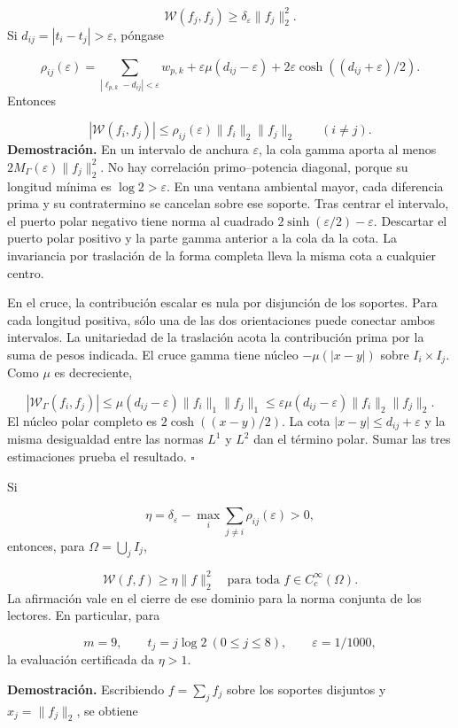 \[
\mathscr W(f_j,f_j)\geq\delta_\varepsilon\|f_j\|_2^2.
\]
Si \(d_{ij}=|t_i-t_j|>\varepsilon\), póngase

\[
\rho_{ij}(\varepsilon)=
\sum_{|\ell_{p,k}-d_{ij}|<\varepsilon}w_{p,k}
+\varepsilon\mu(d_{ij}-\varepsilon)
+2\varepsilon\cosh((d_{ij}+\varepsilon)/2).
\]
Entonces

\[
|\mathscr W(f_i,f_j)|
\leq\rho_{ij}(\varepsilon)\|f_i\|_2\|f_j\|_2
\qquad(i\neq j).
\]
\textbf{Demostración.} En un intervalo de anchura \(\varepsilon\), la cola gamma aporta al menos \(2M_\Gamma(\varepsilon)\|f_j\|_2^2\). No hay correlación primo–potencia diagonal, porque su longitud mínima es \(\log2>\varepsilon\). En una ventana ambiental mayor, cada diferencia prima y su contratermino se cancelan sobre ese soporte. Tras centrar el intervalo, el puerto polar negativo tiene norma al cuadrado \(2\sinh(\varepsilon/2)-\varepsilon\). Descartar el puerto polar positivo y la parte gamma anterior a la cola da la cota. La invariancia por traslación de la forma completa lleva la misma cota a cualquier centro.

En el cruce, la contribución escalar es nula por disjunción de los soportes. Para cada longitud positiva, sólo una de las dos orientaciones puede conectar ambos intervalos. La unitariedad de la traslación acota la contribución prima por la suma de pesos indicada. El cruce gamma tiene núcleo \(-\mu(|x-y|)\) sobre \(I_i\times I_j\). Como \(\mu\) es decreciente,

\[
|\mathscr W_\Gamma(f_i,f_j)|
\leq\mu(d_{ij}-\varepsilon)\|f_i\|_1\|f_j\|_1
\leq\varepsilon\mu(d_{ij}-\varepsilon)\|f_i\|_2\|f_j\|_2.
\]
El núcleo polar completo es \(2\cosh((x-y)/2)\). La cota \(|x-y|\leq d_{ij}+\varepsilon\) y la misma desigualdad entre las normas \(L^1\) y \(L^2\) dan el término polar. Sumar las tres estimaciones prueba el resultado. \hfill\(\square\)

Si

\[
\eta=\delta_\varepsilon-
\max_i\sum_{j\neq i}\rho_{ij}(\varepsilon)>0,
\]
entonces, para \(\Omega=\bigcup_j I_j\),

\[
\boxed{\mathscr W(f,f)\geq\eta\|f\|_2^2
\quad\text{para toda }f\in C_c^\infty(\Omega).}
\]
La afirmación vale en el cierre de ese dominio para la norma conjunta de los lectores. En particular, para

\[
m=9,\qquad t_j=j\log2\ (0\leq j\leq8),\qquad
\varepsilon=1/1000,
\]
la evaluación certificada da \(\eta>1\).

\textbf{Demostración.} Escribiendo \(f=\sum_jf_j\) sobre los soportes disjuntos y \(x_j=\|f_j\|_2\), se obtiene

